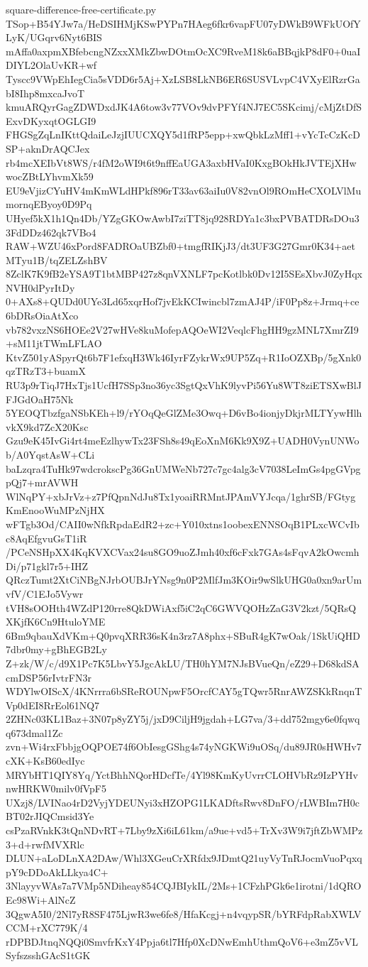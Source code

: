 \documentclass[11pt]{article}
\theoremstyle{definition}
\theoremstyle{remark}
\begin{document}
\begin{filecontents*}[overwrite]{square-difference-free-certificate.py}
TSop+B54YJw7a/HeDSIHMjKSwPYPn7HAeg6fkr6vapFU07yDWkB9WFkUOfYLyK/UGqrv6Nyt6BIS
mAffa0axpmXBfebcngNZxxXMkZbwDOtmOcXC9RveM18k6aBBqjkP8dF0+0uaIDIYL2OlaUvKR+wf
Tyscc9VWpEhIegCia5sVDD6r5Aj+XzLSB8LkNB6ER6SUSVLvpC4VXyElRzrGabI8Ihp8mxcaJvoT
kmuARQyrGagZDWDxdJK4A6tow3v77VOv9dvPFYf4NJ7EC5SKcimj/cMjZtDfSExvDKyxqtOGLGI9
FHGSgZqLnIKttQdaiLeJzjIUUCXQY5d1fRP5epp+xwQbkLzMff1+vYcTcCzKcDSP+aknDrAQCJex
rb4mcXEIbVt8WS/r4fM2oWI9t6t9nffEaUGA3axbHVaI0KxgBOkHkJVTEjXHwwocZBtLYhvmXk59
EU9eVjizCYuHV4mKmWLdHPkf896rT33av63aiIu0V82vnOl9ROmHeCXOLVlMumornqEByoy0D9Pq
UHyef5kX1h1Qn4Db/YZgGKOwAwbI7ziTT8jq928RDYa1c3bxPVBATDRsDOu33FdDDz462qk7VBo4
RAW+WZU46xPord8FADROaUBZbf0+tmgfRIKjJ3/dt3UF3G27Gmr0K34+aetMTyu1B/tqZELZshBV
8ZclK7K9fB2eYSA9T1btMBP427z8qnVXNLF7pcKotlbk0Dv12I5SEsXbvJ0ZyHqxNVH0dPyrItDy
0+AXs8+QUDd0UYe3Ld65xqrHof7jvEkKCIwincbl7zmAJ4P/iF0Pp8z+Jrmq+ce6bDRsOiaAtXco
vb782vxzNS6HOEe2V27wHVe8kuMofepAQOeWI2VeqlcFhgHH9gzMNL7XmrZI9+sM11jtTWmLFLAO
KtvZ501yASpyrQt6b7F1efxqH3Wk46IyrFZykrWx9UP5Zq+R1IoOZXBp/5gXnk0qzTRzT3+buamX
RU3p9rTiqJ7HxTjs1UcfH7SSp3no36yc3SgtQxVhK9lyvPi56Yu8WT8ziETSXwBlJFJGdOaH75Nk
5YEOQTbzfgaNSbKEh+l9/rYOqQeGlZMe3Owq+D6vBo4ionjyDkjrMLTYywHlhvkX9kd7ZcX20Ksc
Gzu9eK45IvGi4rt4meEzlhywTx23FSh8s49qEoXnM6Kk9X9Z+UADH0VynUNWob/A0YqstAsW+CLi
baLzqra4TuHk97wdcrokscPg36GnUMWeNb727c7gc4alg3cV7038LeImGs4pgGVpgpQj7+mrAVWH
WlNqPY+xbJrVz+z7PfQpnNdJu8Tx1yoaiRRMntJPAmVYJcqa/1ghrSB/FGtygKmEnooWuMPzNjHX
wFTgb3Od/CAII0wNfkRpdaEdR2+zc+Y010xtns1oobexENNSOqB1PLxcWCvIbc8AqEfgvuGsT1iR
/PCeNSHpXX4KqKVXCVax24su8GO9uoZJmh40xf6cFxk7GAs4sFqvA2kOwcmhDi/p71gkl7r5+IHZ
QRczTumt2XtCiNBgNJrbOUBJrYNsg9n0P2MlfJm3KOir9wSlkUHG0a0xn9arUmvfV/C1EJo5Vywr
tVH8sOOHth4WZdP120rre8QkDWiAxf5iC2qC6GWVQOHzZaG3V2kzt/5QRsQXKjfK6Cn9HtuloYME
6Bm9qbauXdVKm+Q0pvqXRR36sK4n3rz7A8phx+SBuR4gK7wOak/1SkUiQHD7dbr0my+gBhEGB2Ly
Z+zk/W/c/d9X1Pc7K5LbvY5JgcAkLU/TH0hYM7NJsBVueQn/eZ29+D68kdSAcmDSP56rIvtrFN3r
WDYlwOIScX/4KNrrra6bSReROUNpwF5OrcfCAY5gTQwr5RnrAWZSKkRnqnTVp0dEI8RrEol61NQ7
2ZHNc03KL1Baz+3N07p8yZY5j/jxD9CiljH9jgdah+LG7va/3+dd752mgy6e0fqwqq673dmal1Zc
zvn+Wi4rxFbbjgOQPOE74f6ObIesgGShg4s74yNGKWi9uOSq/du89JR0sHWHv7cXK+KsB60edIyc
MRYbHT1QIY8Yq/YctBhhNQorHDcfTe/4Yl98KmKyUvrrCLOHVbRz9IzPYHvnwHRKW0milv0fVpF5
UXzj8/LVINao4rD2VyjYDEUNyi3xHZOPG1LKADftsRwv8DnFO/rLWBIm7H0cBT02rJIQCmsid3Ye
csPzaRVnkK3tQnNDvRT+7Lby9zXi6iL61km/a9ue+vd5+TrXv3W9i7jftZbWMPz3+d+rwfMVXRlc
DLUN+aLoDLnXA2DAw/Whl3XGeuCrXRfdx9JDmtQ21uyVyTnRJocmVuoPqxqpY9cDDoAkLLkya4C+
3NlayyvWAs7a7VMp5NDiheay854CQJBIykIL/2Ms+1CFzhPGk6e1irotni/1dQROEc98Wi+AlNcZ
3QgwA5I0/2Nl7yR8SF475LjwR3we6fe8/HfaKcgj+n4vqypSR/bYRFdpRabXWLVCCM+rXC779K/4
rDPBDJtnqNQQi0SmvfrKxY4Ppja6tl7Hfp0XcDNwEmhUthmQoV6+e3mZ5vVLSyfszsshGAcS1tGK

\end{filecontents*}
\end{document}
